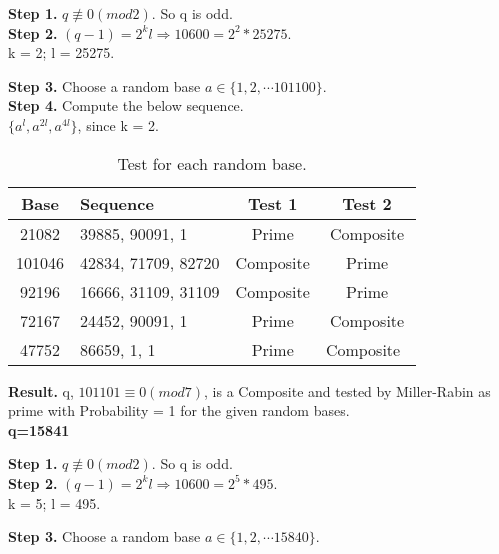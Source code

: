 \documentclass [12pt]{article}
\theoremstyle{definition}
\begin{document}
\phantom{1em} {\bf Step 1.} $q \not\equiv 0 (mod 2)$. So q is odd. \\

\phantom{1em} {\bf Step 2.} $ (q - 1) = 2^{k}l  \Longrightarrow 10600 = 2^{2}*25275 $.\\
\phantom{1000em} k = 2; l = 25275.

\phantom{1em} {\bf Step 3.} Choose a random base $a \in \{1, 2, \dotsb 101100 \}$. \\
\newpage
\phantom{1em} {\bf Step 4.} Compute the below sequence. \\
\phantom{1000em} $\{a^{l}, a^{2l}, a^{4l}\}$, since k = 2.

\begin{table}[h!]
  \begin{center}
    \caption{Test for each random base.}
    \label{tab:Miller-Rabin}
    \begin{tabular}{c|l|c|c} %
      \textbf{Base} & \textbf{Sequence} & \textbf{Test 1} & \textbf{Test 2}\\
      \hline
       21082& 39885, 90091, 1 & Prime & Composite\\
       101046 & 42834, 71709, 82720 & Composite & Prime\\
       92196 & 16666, 31109, 31109 & Composite & Prime\\
       72167 & 24452, 90091, 1 & Prime & Composite\\
       47752 & 86659, 1, 1 & Prime & Composite\
    \end{tabular}
  \end{center}
\end{table}

\phantom{1em} {\bf Result.} q, $101101 \equiv 0 (mod 7)$, is a Composite and tested by Miller-Rabin as prime with Probability = 1 for the given random bases. \\

\phantom{1em} {\bf q=15841}

\phantom{1em} {\bf Step 1.} $q \not\equiv 0 (mod 2)$. So q is odd. \\

\phantom{1em} {\bf Step 2.} $ (q - 1) = 2^{k}l  \Longrightarrow 10600 = 2^{5}*495$.\\
\phantom{1000em} k = 5; l = 495.

\phantom{1em} {\bf Step 3.} Choose a random base $a \in \{1, 2, \dotsb 15840 \}$. \\
 
\end{document}
